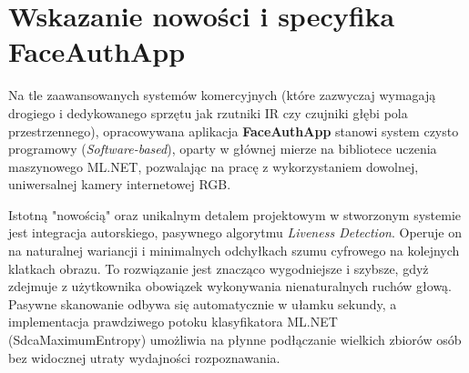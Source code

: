 \section{Wskazanie nowości i specyfika FaceAuthApp}
Na tle zaawansowanych systemów komercyjnych (które zazwyczaj wymagają drogiego i dedykowanego sprzętu jak rzutniki IR czy czujniki głębi pola przestrzennego), opracowywana aplikacja \textbf{FaceAuthApp} stanowi system czysto programowy (\textit{Software-based}), oparty w głównej mierze na bibliotece uczenia maszynowego ML.NET, pozwalając na pracę z wykorzystaniem dowolnej, uniwersalnej kamery internetowej RGB. 

Istotną "nowością" oraz unikalnym detalem projektowym w stworzonym systemie jest integracja autorskiego, pasywnego algorytmu \textit{Liveness Detection}. Operuje on na naturalnej wariancji i minimalnych odchyłkach szumu cyfrowego na kolejnych klatkach obrazu. To rozwiązanie jest znacząco wygodniejsze i szybsze, gdyż zdejmuje z użytkownika obowiązek wykonywania nienaturalnych ruchów głową. Pasywne skanowanie odbywa się automatycznie w ułamku sekundy, a implementacja prawdziwego potoku klasyfikatora ML.NET (SdcaMaximumEntropy) umożliwia na płynne podłączanie wielkich zbiorów osób bez widocznej utraty wydajności rozpoznawania.
